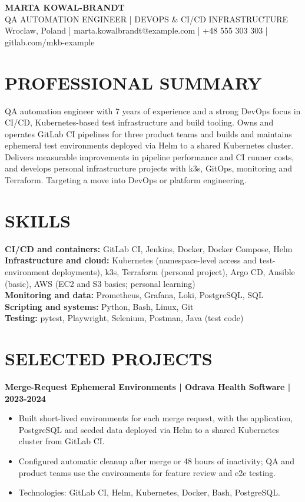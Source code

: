 \documentclass[11pt,a4paper]{article}
\begin{document}
\begin{center}
{\Huge\bfseries\color{primarycolor} MARTA KOWAL-BRANDT}\\[0.3em]
{\large QA AUTOMATION ENGINEER | DEVOPS \& CI/CD INFRASTRUCTURE}\\[0.3em]
Wroclaw, Poland | marta.kowalbrandt@example.com | +48 555 303 303 | gitlab.com/mkb-example
\end{center}

\section*{PROFESSIONAL SUMMARY}
QA automation engineer with 7 years of experience and a strong DevOps focus in CI/CD, Kubernetes-based test infrastructure and build tooling. Owns and operates GitLab CI pipelines for three product teams and builds and maintains ephemeral test environments deployed via Helm to a shared Kubernetes cluster. Delivers measurable improvements in pipeline performance and CI runner costs, and develops personal infrastructure projects with k3s, GitOps, monitoring and Terraform. Targeting a move into DevOps or platform engineering.

\section*{SKILLS}
\textbf{CI/CD and containers:} GitLab CI, Jenkins, Docker, Docker Compose, Helm\\
\textbf{Infrastructure and cloud:} Kubernetes (namespace-level access and test-environment deployments), k3s, Terraform (personal project), Argo CD, Ansible (basic), AWS (EC2 and S3 basics; personal learning)\\
\textbf{Monitoring and data:} Prometheus, Grafana, Loki, PostgreSQL, SQL\\
\textbf{Scripting and systems:} Python, Bash, Linux, Git\\
\textbf{Testing:} pytest, Playwright, Selenium, Postman, Java (test code)

\section*{SELECTED PROJECTS}
\textbf{Merge-Request Ephemeral Environments | Odrava Health Software | 2023-2024}
\begin{itemize}
\item Built short-lived environments for each merge request, with the application, PostgreSQL and seeded data deployed via Helm to a shared Kubernetes cluster from GitLab CI.
\item Configured automatic cleanup after merge or 48 hours of inactivity; QA and product teams use the environments for feature review and e2e testing.
\item Technologies: GitLab CI, Helm, Kubernetes, Docker, Bash, PostgreSQL.
\end{itemize}
\end{document}
